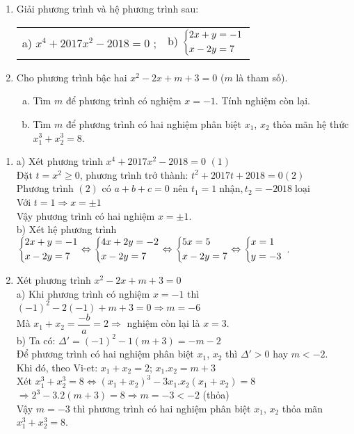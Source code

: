 \begin{ex}%
    \hfill
    \begin{enumerate}[1)]
        \item Giải phương trình và hệ phương trình sau:\\
\begin{tabular}{m{} m{}}
a) $x^4+2017x^2-2018=0$ ;&
b) $\left\{\begin{aligned}& 2x+y=-1\\ &x-2y=7\end{aligned}\right.$ 
\end{tabular}
        \item Cho phương trình bậc hai $x^2-2x+m+3=0$ ($m$ là tham số).
\begin{enumerate}[a)]
\item Tìm $m$ để phương trình có nghiệm $x=-1$. Tính nghiệm còn lại.
\item Tìm $m$ để phương trình có hai nghiệm phân biệt $x_1$, $x_2$ thỏa mãn hệ thức $x_1^3+x_2^3=8$.
\end{enumerate}
    \end{enumerate}
\loigiai
    {
\begin{enumerate}[1)]
\item a) Xét phương trình $x^4+2017x^2-2018=0$ \;\;$(1)$\\
Đặt $t=x^2 \ge 0$, phương trình trở thành: $t^2+2017t+2018=0$\;\;$(2)$\\
Phương trình $(2)$ có $a+b+c=0$ nên $t_1=1 \; \text{nhận}, t_2=-2018 \;\text{loại}$\\
Với $t=1 \Rightarrow x=\pm 1$\\
Vậy phương trình có hai nghiệm $x=\pm 1$.\\
b) Xét hệ phương trình $\left\{\begin{aligned}& 2x+y=-1\\ &x-2y=7\end{aligned}\right.  \Leftrightarrow \left\{\begin{aligned}& 4x+2y=-2\\ &x-2y=7\end{aligned}\right. \Leftrightarrow \left\{\begin{aligned}& 5x=5\\ &x-2y=7\end{aligned}\right. \Leftrightarrow \left\{\begin{aligned}& x=1\\ &y=-3\end{aligned}\right.$ .
\item Xét phương trình $x^2-2x+m+3=0$\\
a) Khi phương trình có nghiệm $x=-1$ thì $(-1)^2-2(-1)+m+3=0 \Rightarrow m=-6$\\
Mà $x_1+x_2=\dfrac{-b}{a}=2 \Rightarrow$ nghiệm còn lại là $x=3$.\\
b) Ta có: $\Delta'=(-1)^2-1(m+3)=-m-2$\\
Để phương trình có hai nghiệm phân biệt $x_1$, $x_2$ thì $\Delta'>0$ hay $m<-2$.\\
Khi đó, theo Vi-et: $x_1+x_2=2$; $x_1.x_2=m+3$\\
Xét $x_1^3+x_2^3=8 \Leftrightarrow \left(x_1+x_2\right)^3-3x_1.x_2\left(x_1+x_2\right)=8$ \\
$\Rightarrow 2^3-3.2(m+3)=8 \Rightarrow m=-3<-2$ (thỏa)\\
Vậy $m=-3$ thì phương trình có hai nghiệm phân biệt $x_1$, $x_2$  thỏa mãn $ x_1^3+x_2^3=8 $.
\end{enumerate}   
    }
\end{ex}

